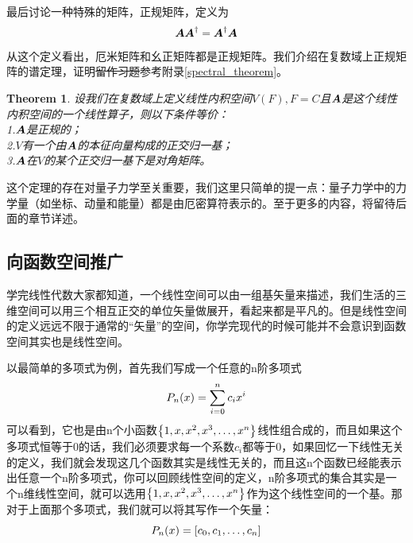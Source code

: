 \documentclass[12pt,a4paper,openany,twoside]{book}
\newtheorem{theorem}{Theorem}[section]
\numberwithin{equation}{section}
\begin{document}
          最后讨论一种特殊的矩阵，正规矩阵，定义为
          \begin{equation}
            \vb*{A}\vb*{A}^\dagger=\vb*{A}^\dagger\vb*{A}
          \end{equation}
          从这个定义看出，厄米矩阵和幺正矩阵都是正规矩阵。我们介绍在复数域上正规矩阵的谱定理，证明\sout{留作习题}参考附录\ref{spectral_theorem}。
          \begin{theorem}
            设我们在复数域上定义线性内积空间$V(F),F=C$且$\vb*{A}$是这个线性内积空间的一个线性算子，则以下条件等价：\\
            1.$\vb*{A}$是正规的；\\
            2.$V$有一个由$\vb*{A}$的本征向量构成的正交归一基；\\
            3.$\vb*{A}$在$V$的某个正交归一基下是对角矩阵。
          \end{theorem}
          这个定理的存在对量子力学至关重要，我们这里只简单的提一点：量子力学中的力学量（如坐标、动量和能量）都是由厄密算符表示的。至于更多的内容，将留待后面的章节详述。

        \subsection{向函数空间推广}
          \label{expantion_to_function_space}
          学完线性代数大家都知道，一个线性空间可以由一组基矢量来描述，我们生活的三维空间可以用三个相互正交的单位矢量做展开，看起来都是平凡的。但是线性空间的定义远远不限于通常的“矢量”的空间，你学完现代的时候可能并不会意识到函数空间其实也是线性空间。

          以最简单的多项式为例，首先我们写成一个任意的n阶多项式
          \begin{equation}
            P_n\qty(x)=\sum_{i=0}^n{c_i x^i}
          \end{equation}
          可以看到，它也是由n个小函数$\qty{1,x,x^2,x^3,\dots,x^n}$线性组合成的，而且如果这个多项式恒等于0的话，我们必须要求每一个系数$c_i$都等于0，如果回忆一下线性无关的定义，我们就会发现这几个函数其实是线性无关的，而且这n个函数已经能表示出任意一个n阶多项式，你可以回顾线性空间的定义，n阶多项式的集合其实是一个n维线性空间，就可以选用$\qty{1,x,x^2,x^3,\dots,x^n}$作为这个线性空间的一个基。那对于上面那个多项式，我们就可以将其写作一个矢量：
          \begin{equation}
            P_n\qty(x)=\qty[c_0,c_1,\dots,c_n]
          \end{equation}
\end{document}

